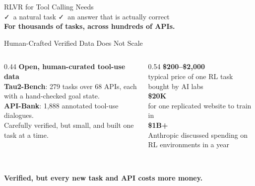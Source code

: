 \documentclass[scheme=plain,aspectratio=169]{beamer}
\begin{document}
\begin{frame}{RLVR for Tool Calling Needs}
  \centering
  \\[14pt]
  {\small {\color{barpos}\faCheck}~a natural task \qquad
          {\color{barpos}\faCheck}~an answer that is actually correct}\\[6pt]
  {\small\bfseries For thousands of tasks, across hundreds of APIs.}
\end{frame}

\begin{frame}{Human-Crafted Verified Data Does Not Scale}
  \begin{columns}[c]
    \begin{column}{0.44\linewidth}
      {\small\bfseries Open, human-curated tool-use data}\\[6pt]
      {\small \textbf{Tau2-Bench}: 279 tasks over 68 APIs, each with a hand-checked goal state.}\\[6pt]
      {\small \textbf{API-Bank}: 1,888 annotated tool-use dialogues.}\\[10pt]
      {\small Carefully verified, but small, and built one task at a time.}
    \end{column}
    \begin{column}{0.54\linewidth}
      {\color{barpos}\fontsize{24}{28}\selectfont\textbf{\$200--\$2,000}}\\
      {\small typical price of one RL task bought by AI labs}\\[4pt]
      {\color{barpos}\fontsize{24}{28}\selectfont\textbf{\$20K}}\\
      {\small for one replicated website to train in}\\[4pt]
      {\color{barpos}\fontsize{24}{28}\selectfont\textbf{\$1B+}}\\
      {\small Anthropic discussed spending on RL environments in a year}
    \end{column}
  \end{columns}
  \vspace{10pt}
  \\
  {\small\bfseries Verified, but every new task and API costs more money.}
\end{frame}
\end{document}
